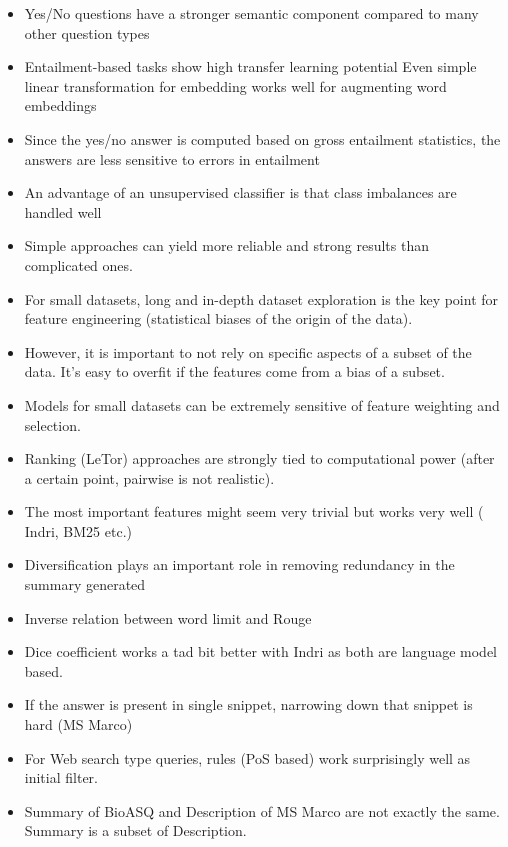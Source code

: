 \begin{itemize}
    \item Yes/No questions have a stronger semantic component compared to many other question types
    \item Entailment-based tasks show high transfer learning potential
    Even simple linear transformation for embedding works well for augmenting word embeddings
    \item Since the yes/no answer is computed based on gross entailment statistics, the answers are less sensitive to errors in entailment
    \item An advantage of an unsupervised classifier is that class imbalances are handled well

\item Simple approaches can yield more reliable and strong results than complicated ones.
\item For small datasets, long and in-depth dataset exploration is the key point for feature engineering (statistical biases of the origin of the data).
\item However, it is important to not rely on specific aspects of a subset of the data. It’s easy to overfit if the features come from a bias of a subset.
\item Models for small datasets can be extremely sensitive of feature weighting and selection. 
\item Ranking (LeTor) approaches are strongly tied to computational power (after a certain point, pairwise is not realistic).

\item The most important features might seem very trivial but works very well ( Indri, BM25 etc.) 
\item Diversification plays an important role in removing redundancy in the summary generated
\item Inverse relation between word limit and Rouge
\item Dice coefficient works a tad bit better  with Indri as both are language model based.
\item If the answer is present in single snippet, narrowing down that snippet is hard (MS Marco) 
\item For Web search type queries, rules (PoS based) work surprisingly well as initial filter.
\item Summary of BioASQ and Description of MS Marco are not exactly the same. Summary is a subset of Description.

\end{itemize}

